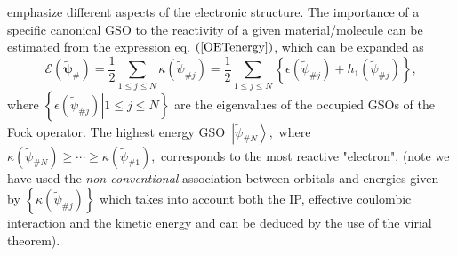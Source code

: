 \documentclass[aps,preprint]{revtex4}%
\begin{document}
emphasize different aspects of the electronic structure. The importance of a
specific canonical GSO to the reactivity of a given material/molecule can be
estimated from the expression eq. $\left(  \ref{OETenergy}\right)  $, which
can be expanded as
\begin{equation}
\mathcal{E}\left(  \boldsymbol{\tilde{\psi}}_{\#}\right)  =\frac{1}{2}%
\sum_{1\leq j\leq N}\kappa\left(  \tilde{\psi}_{\#j}\right)  =\frac{1}{2}%
\sum_{1\leq j\leq N}\left\{  \epsilon\left(  \tilde{\psi}_{\#j}\right)
+h_{1}\left(  \tilde{\psi}_{\#j}\right)  \right\}  , \label{FockEn}%
\end{equation}
where $\left\{  \left.  \epsilon\left(  \tilde{\psi}_{\#j}\right)  \right\vert
1\leq j\leq N\right\}  $ are the eigenvalues of the occupied GSOs of the Fock
operator. The highest energy GSO\ $\left\vert \tilde{\psi}_{\#N}\right\rangle
,$ where $\kappa\left(  \tilde{\psi}_{\#N}\right)  \geq\cdots\geq\kappa\left(
\tilde{\psi}_{\#1}\right)  ,$ corresponds to the most reactive "electron",
(note we have used the \emph{non conventional} association between orbitals
and energies given by $\left\{  \kappa\left(  \tilde{\psi}_{\#j}\right)
\right\}  $ which takes into account both the IP, effective coulombic
interaction and the kinetic energy and can be deduced by the use of the virial theorem).
\end{document}
